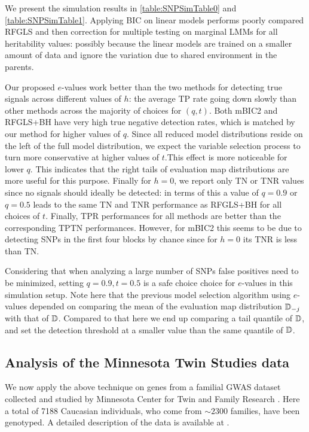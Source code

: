 We present the simulation results in \ref{table:SNPSimTable0} and \ref{table:SNPSimTable1}. Applying BIC on linear models performs poorly compared RFGLS and then correction for multiple testing on marginal LMMs for all heritability values: possibly because the linear models are trained on a smaller amount of data and ignore the variation due to shared environment in the parents.

Our proposed $e$-values work better than the two methods for detecting true signals across different values of $h$: the average TP rate going down slowly than other methods across the majority of choices for $(q,t)$. Both mBIC2 and RFGLS+BH have very high true negative detection rates, which is matched by our method for higher values of $q$. Since all reduced model distributions reside on the left of the full model distribution, we expect the variable selection process to turn more conservative at higher values of $t$.This effect is more noticeable for lower $q$. This indicates that the right tails of evaluation map distributions are more useful for this purpose. Finally for $h=0$, we report only TN or TNR values since no signals should ideally be detected: in terms of this a value of $q=0.9$ or $q=0.5$ leads to the same TN and TNR performance as RFGLS+BH for all choices of $t$. Finally, TPR performances for all methods are better than the corresponding TPTN performances. However, for mBIC2 this seems to be due to detecting SNPs in the first four blocks by chance since for $h=0$ its TNR is less than TN.

Considering that when analyzing a large number of SNPs false positives need to be minimized, setting $q=0.9, t=0.5$ is a safe choice choice for $e$-values in this simulation setup. Note here that the previous model selection algorithm using $e$-values depended on comparing the mean of the evaluation map distribution ${\mathbb{D}}_{-j}$ with that of ${\mathbb{D}}$. Compared to that here we end up comparing a tail quantile of ${\mathbb{D}}$, and set the detection threshold at a smaller value than the same quantile of ${\mathbb{D}}$.

\subsection{Analysis of the Minnesota Twin Studies data}
We now apply the above technique on genes from a familial GWAS dataset collected and studied by Minnesota Center for Twin and Family Research \citep{MillerEtal12,McGueEtal13,LiEtal11}. Here a total of 7188 Caucasian individuals, who come from $\sim 2300$ families, have been genotyped. A detailed description of the data is available at \cite{MillerEtal12}.

